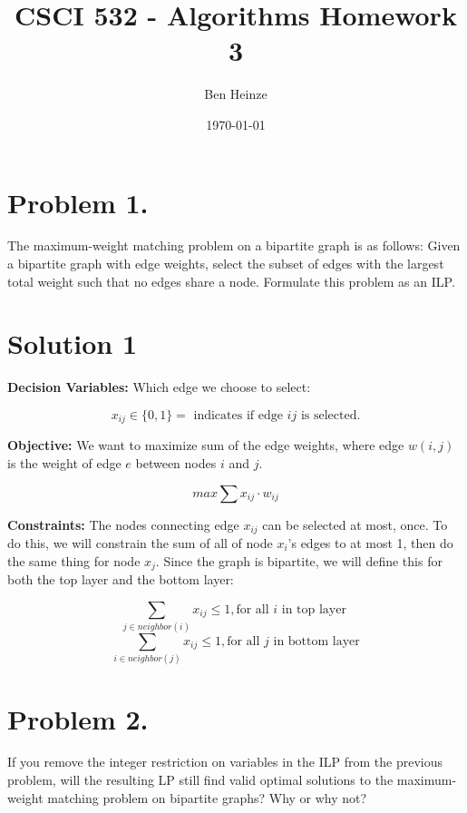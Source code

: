\documentclass[11pt]{article}
\author{Ben Heinze}
\date{\today}
\title{CSCI 532 - Algorithms Homework 3}
\begin{document}
\maketitle



\section{Problem 1.}
\label{sec:org0a5b5e8}

The maximum-weight matching problem on a bipartite graph is as follows:
Given a bipartite graph with edge weights, select the subset of edges with the largest total
weight such that no edges share a node. Formulate this problem as an ILP.

\section{Solution 1}
\label{sec:org3bb22e4}

\textbf{\textbf{Decision Variables:}} Which edge we choose to select:

\[ x_{ij} \in \{0,1\} = \text{ indicates if edge } ij \text{ is selected.} \]


\textbf{\textbf{Objective:}} We want to maximize sum of the edge weights, where edge \(w(i,j)\) is the weight of edge \(e\) between nodes \(i\) and \(j\).

\[ max \sum x_{ij} \cdot w_{ij} \]

\textbf{\textbf{Constraints:}} The nodes connecting edge \(x_{ij}\) can be selected at most, once. To do this, we will constrain the sum of all of node \(x_i\)'s edges to at most 1, then do the same thing for node \(x_j\). Since the graph is bipartite,  we will define this for both the top layer and the bottom layer:

\[ \sum_{j \in neighbor(i)} x_{ij} \leq 1, \text{for all } i \text{ in top layer } \]
\[ \sum_{i \in neighbor(j)} x_{ij} \leq 1, \text{for all } j \text{ in bottom layer} \]

\newpage

\section{Problem 2.}
\label{sec:org2204487}

If you remove the integer restriction on variables in the ILP from the previous
problem, will the resulting LP still find valid optimal solutions to the maximum-weight matching problem on bipartite graphs? Why or why not?
\end{document}
